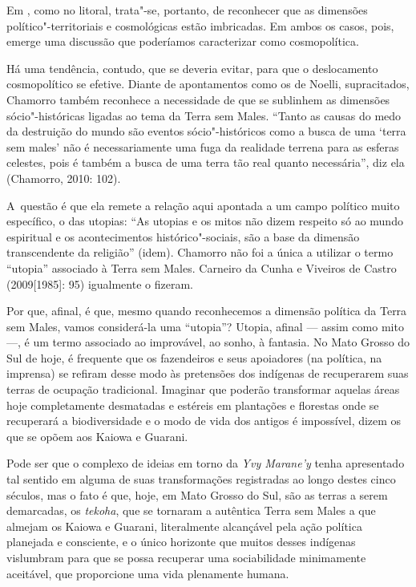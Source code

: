 Em , como no litoral, trata"-se, portanto, de reconhecer que as
dimensões político"-territoriais e cosmológicas estão imbricadas. Em
ambos os casos, pois, emerge uma discussão que poderíamos caracterizar
como cosmopolítica.

Há uma tendência, contudo, que se deveria evitar, para que o
deslocamento cosmopolítico se efetive. Diante de apontamentos como os
de Noelli, supracitados, Chamorro também reconhece a necessidade de que
se sublinhem as dimensões sócio"-históricas ligadas ao tema da Terra sem
Males. ``Tanto as causas do medo da destruição do mundo são eventos
sócio"-históricos como a busca de uma ‘terra sem males’ não é
necessariamente uma fuga da realidade terrena para as esferas celestes,
pois é também a busca de uma terra tão real quanto necessária'', diz ela
(Chamorro, 2010: 102). 

A~questão é que ela remete a relação aqui apontada a um campo político
muito específico, o das utopias: ``As utopias e os mitos não dizem
respeito só ao mundo espiritual e os acontecimentos histórico"-sociais,
são a base da dimensão transcendente da religião'' (idem). Chamorro não
foi a única a utilizar o termo ``utopia'' associado à Terra sem Males.
Carneiro da Cunha e Viveiros de Castro (2009[1985]: 95) igualmente o
fizeram. 

Por que, afinal, é que, mesmo quando reconhecemos a dimensão política da
Terra sem Males, vamos considerá-la uma ``utopia''? Utopia, afinal ---
assim como mito ---, é um termo associado ao improvável, ao sonho, à
fantasia. No Mato Grosso do Sul de hoje, é frequente que os fazendeiros
e seus apoiadores (na política, na imprensa) se refiram desse modo às
pretensões dos indígenas de recuperarem suas terras de ocupação
tradicional. Imaginar que poderão transformar aquelas áreas hoje
completamente desmatadas e estéreis em plantações e florestas onde se
recuperará a biodiversidade e o modo de vida dos antigos é impossível,
dizem os que se opõem aos Kaiowa e Guarani.

Pode ser que o complexo de ideias em torno da \emph{Yvy Marane’y} tenha
apresentado tal sentido em alguma de suas transformações registradas ao
longo destes cinco séculos, mas o fato é que, hoje, em Mato Grosso do
Sul, são as terras a serem demarcadas, os \emph{tekoha}, que se tornaram a
autêntica Terra sem Males a que almejam os Kaiowa e Guarani,
literalmente alcançável pela ação política planejada e consciente, e o
único horizonte que muitos desses indígenas vislumbram para que se
possa recuperar uma sociabilidade minimamente aceitável, que
proporcione uma vida plenamente humana.

